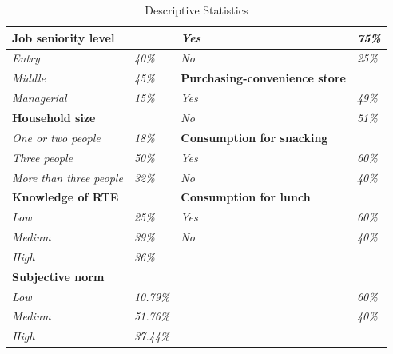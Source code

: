 \documentclass[a4,12pt]{article}
\begin{document}
\begin{table}[H]
\begin{tabular}{l|l|l|l}
\textbf{Job seniority level}      & \textit{}          & \textit{Yes}                                   & \textit{75\%}      \\ \hline
\textit{Entry}                    & \textit{40\%}      & \textit{No}                                    & \textit{25\%}      \\ \hline
\textit{Middle}                   & \textit{45\%}      & \textbf{Purchasing-convenience store} & \textit{}          \\ \hline
\textit{Managerial}               & \textit{15\%}      & \textit{Yes}                                   & \textit{49\%}      \\ \hline
\textbf{Household size}           & \textit{}          & \textit{No}                                    & \textit{51\%}      \\ \hline
\textit{One or two people}        & \textit{18\%}      & \textbf{Consumption for snacking}              & \textit{}          \\ \hline
\textit{Three people}             & \textit{50\%}      & \textit{Yes}                                   & \textit{60\%}      \\ \hline
\textit{More than three people}   & \textit{32\%}      & \textit{No}                                    & \textit{40\%}      \\ \hline
\textbf{Knowledge of RTE}         & \textit{}          & \textbf{Consumption for lunch}                 & \textit{}          \\ \hline
\textit{Low}                      & \textit{25\%}      & \textit{Yes}                                   & \textit{60\%}      \\ \hline
\textit{Medium}                   & \textit{39\%}      & \textit{No}                                    & \textit{40\%}      \\ \hline
\textit{High}                     & \textit{36\%}      &                                                & \textit{}          \\ \hline

\textbf{Subjective norm}         & \textit{}          & \textbf{}                 & \textit{}          \\ \hline
\textit{Low}                      & \textit{10.79\%}      & \textit{}                                   & \textit{60\%}      \\ \hline
\textit{Medium}                   & \textit{51.76\%}      & \textit{}                                    & \textit{40\%}      \\ \hline
\textit{High}                     & \textit{37.44\%}      &                                                & \textit{}          \\ \hline
    
\end{tabular}
\caption{Descriptive Statistics}
\label{table:statistics}
\end{table}
\end{document}
